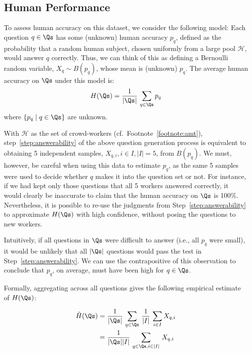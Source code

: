 \subsection{Human Performance}
\label{subsec:human}

To assess human accuracy on this dataset, we consider the following model: Each question $q \in \Qs$ has some (unknown) human accuracy $p_q$, defined as the probability that a random human subject, chosen uniformly from a large pool $\mathcal{H}$, would answer $q$ correctly. Thus, we can think of this as defining a Bernoulli random variable, $X_q \sim B(p_q)$, whose mean is (unknown) $p_q$. The average human accuracy on $\Qs$ under this model is:
\[
  H(\Qs) = \frac{1}{|\Qs|} \, \sum_{q \in \Qs} p_q
\]
where $\{p_q \mid q \in \Qs\}$ are unknown.

With $\mathcal{H}$ as the set of crowd-workers (cf.\ Footnote~\ref{footnote:amt}), step~\ref{step:answerability} of the above question generation process is equivalent to obtaining 5 independent samples, $X_{q,i}, i \in I, |I|=5$, from $B(p_q)$. We must, however, be careful when using this data to estimate $p_q$, as the same 5 samples were used to decide whether $q$ makes it into the question set \Qs or not. For instance, if we had kept only those questions that all 5 workers answered correctly, it would clearly be inaccurate to claim that the human accuracy on $\Qs$ is 100\%. Nevertheless, it is possible to re-use the judgments from Step~\ref{step:answerability} to approximate $H(\Qs)$ with high confidence, without posing the questions to new workers.

Intuitively, if all questions in $\Qs$ were difficult to answer (i.e., all $p_q$ were small), it would be unlikely that all $|\Qs|$ questions would pass the test in Step~\ref{step:answerability}. We can use the contrapositive of this observation to conclude that $p_q$, on average, must have been high for $q \in \Qs$.

Formally, aggregating across all questions gives the following empirical estimate of $H(\Qs)$:

\begin{align*}
  \tilde{H}(\Qs) & = \frac{1}{|\Qs|} \, \sum_{q \in \Qs} \, \frac{1}{|I|} \, \sum_{i \in I} X_{q,i}\\
    & = \frac{1}{|\Qs| |I|} \, \sum_{q \in \Qs, i \in |I|} \, X_{q,i}
\end{align*}

